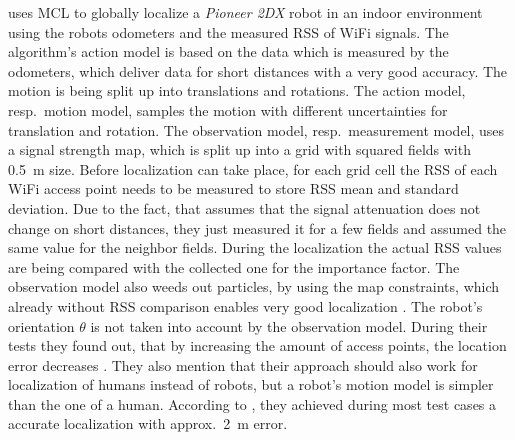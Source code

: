\citep{siddiqi:experiments_mcl_wifi} uses \acs{MCL} to globally localize a \emph{Pioneer 2DX} robot in an indoor environment using the robots odometers and the measured \acs{RSS} of WiFi signals. The algorithm's action model is based on the data which is measured by the odometers, which deliver data for short distances with a very good accuracy. The motion is being split up into translations and rotations. The action model, resp.\ motion model, samples the motion with different uncertainties for translation and rotation. The observation model, resp.\ measurement model, uses a signal strength map, which is split up into a grid with squared fields with 0.5~m size. Before localization can take place, for each grid cell the \acs{RSS} of each WiFi access point needs to be measured to store \acs{RSS} mean and standard deviation. Due to the fact, that \citet{siddiqi:experiments_mcl_wifi} assumes that the signal attenuation does not change on short distances, they just measured it for a few fields and assumed the same value for the neighbor fields. During the localization the actual \acs{RSS} values are being compared with the collected one for the importance factor. The observation model also weeds out particles, by using the map constraints, which already without \acs{RSS} comparison enables very good localization \citep{siddiqi:experiments_mcl_wifi}. The robot's orientation $\theta$ is not taken into account by the observation model.
During their tests they found out, that by increasing the amount of access points, the location error decreases \citep{siddiqi:experiments_mcl_wifi}. They also mention that their approach should also work for localization of humans instead of robots, but a robot's motion model is simpler than the one of a human. According to \citet{siddiqi:experiments_mcl_wifi}, they achieved during most test cases a accurate localization with approx.\ 2~m error.

